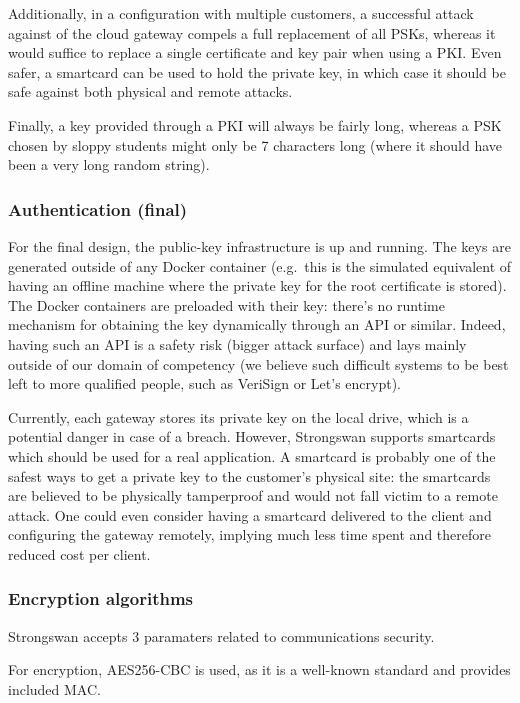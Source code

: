\documentclass[paper=a4, fontsize=11pt]{scrartcl}
\begin{document}
Additionally, in a configuration with multiple customers, a successful attack
against of the cloud gateway compels a full replacement of all PSKs, whereas it
would suffice to replace a single certificate and key pair when using a PKI\@.
Even safer, a smartcard can be used to hold the private key, in which case it
should be safe against both physical and remote attacks.

Finally, a key provided through a PKI will always be fairly long,
whereas a PSK chosen by sloppy students might only be 7 characters long (where
it should have been a very long random string).

\subsubsection{Authentication (final)}

For the final design, the public-key infrastructure is up and running.
The keys are generated outside of any Docker container (e.g.\ this is the
simulated equivalent of having an offline machine where the private key for the
root certificate is stored).
The Docker containers are preloaded with their key: there's no runtime
mechanism for obtaining the key dynamically through an API or similar.
Indeed, having such an API is a safety risk (bigger attack surface) and lays
mainly outside of our domain of competency (we believe such difficult systems to
be best left to more qualified people, such as VeriSign or Let's encrypt).

Currently, each gateway stores its private key on the local drive, which is
a potential danger in case of a breach.
However, Strongswan supports smartcards which should be used for a real
application.
A smartcard is probably one of the safest ways to get a private key
to the customer's physical site: the smartcards are believed to be physically
tamperproof and would not fall victim to a remote attack.
One could even consider having a smartcard delivered to the client and
configuring the gateway remotely, implying much less time spent and therefore
reduced cost per client.

\subsubsection{Encryption algorithms}

Strongswan accepts 3 paramaters related to communications security.

For encryption, AES256-CBC is used, as it is a well-known standard and provides
included MAC\@.
\end{document}
